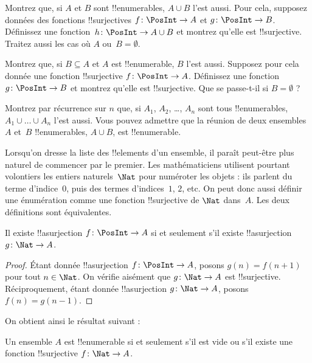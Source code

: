 \documentclass[11pt,a4paper,openany]{memoir}
\begin{document}
\begin{prob}
Montrez que, si $A$ et $B$ sont !!{enumerable}s, $A \cup B$ l’est aussi.
Pour cela, supposez données des fonctions !!{surjective}s
$f\colon \PosInt \to A$ et $g\colon \PosInt \to B$. Définissez une
fonction~$h\colon \PosInt \to A \cup B$ et montrez qu’elle est
!!{surjective}. Traitez aussi les cas où $A$ ou~$B = \emptyset$.
\end{prob}

\begin{prob}
Montrez que, si $B \subseteq A$ et $A$ est !!{enumerable}, $B$ l’est
aussi. Supposez pour cela donnée une fonction !!{surjective}
$f\colon \PosInt \to A$. Définissez une fonction~$g\colon \PosInt \to B$
et montrez qu’elle est !!{surjective}. Que se passe-t-il si
$B = \emptyset$ ?
\end{prob}

\begin{prob}
Montrez par récurrence sur $n$ que, si $A_1$, $A_2$, \dots, $A_n$ sont
tous !!{enumerable}s, $A_1 \cup \dots \cup A_n$ l’est aussi.
Vous pouvez admettre que la réunion de deux ensembles $A$ et~$B$
!!{enumerable}s, $A \cup B$, est !!{enumerable}.
\end{prob}

Lorsqu’on dresse la liste des !!{element}s d’un ensemble, il paraît
peut-être plus naturel de commencer par le premier. Les mathématiciens
utilisent pourtant volontiers les entiers naturels~$\Nat$ pour
numéroter les objets : ils parlent du terme d’indice~$0$, puis des
termes d’indices~$1$, $2$, etc. On peut donc aussi définir une énumération
comme une fonction !!{surjective} de $\Nat$ dans~$A$.
Les deux définitions sont équivalentes.

\begin{prop}
Il existe !!a{surjection} $f\colon \PosInt \to A$ si et seulement
s’il existe !!a{surjection} $g\colon \Nat \to A$.
\end{prop}

\begin{proof}
Étant donnée !!a{surjection} $f\colon \PosInt \to A$, posons
$g(n) = f(n+1)$ pour tout $n \in \Nat$. On vérifie aisément que
$g\colon \Nat \to A$ est !!{surjective}. Réciproquement, étant donnée
!!a{surjection} $g\colon \Nat \to A$, posons $f(n) = g(n-1)$.
\end{proof}

On obtient ainsi le résultat suivant :

\begin{cor}
Un ensemble $A$ est !!{enumerable} si et seulement s’il est vide
ou s’il existe une fonction !!{surjective} $f\colon \Nat \to A$.
\end{cor}
\end{document}
